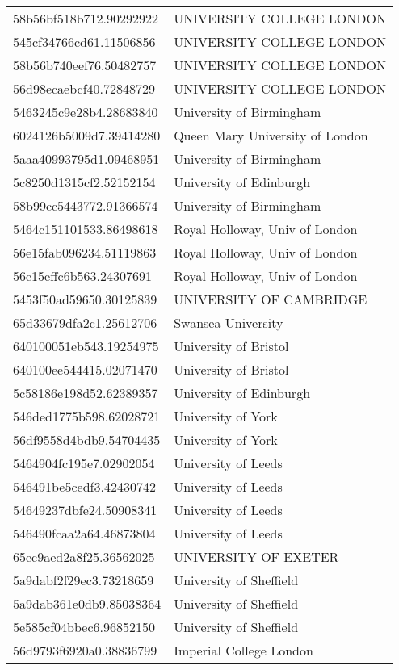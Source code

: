 \begin{tabular}{ll}
58b56bf518b712.90292922 & UNIVERSITY COLLEGE LONDON \\
545cf34766cd61.11506856 & UNIVERSITY COLLEGE LONDON \\
58b56b740eef76.50482757 & UNIVERSITY COLLEGE LONDON \\
56d98ecaebcf40.72848729 & UNIVERSITY COLLEGE LONDON \\
5463245c9e28b4.28683840 & University of Birmingham \\
6024126b5009d7.39414280 & Queen Mary University of London \\
5aaa40993795d1.09468951 & University of Birmingham \\
5c8250d1315cf2.52152154 & University of Edinburgh \\
58b99cc5443772.91366574 & University of Birmingham \\
5464c151101533.86498618 & Royal Holloway, Univ of London \\
56e15fab096234.51119863 & Royal Holloway, Univ of London \\
56e15effc6b563.24307691 & Royal Holloway, Univ of London \\
5453f50ad59650.30125839 & UNIVERSITY OF CAMBRIDGE \\
65d33679dfa2c1.25612706 & Swansea University \\
640100051eb543.19254975 & University of Bristol \\
640100ee544415.02071470 & University of Bristol \\
5c58186e198d52.62389357 & University of Edinburgh \\
546ded1775b598.62028721 & University of York \\
56df9558d4bdb9.54704435 & University of York \\
5464904fc195e7.02902054 & University of Leeds \\
546491be5cedf3.42430742 & University of Leeds \\
54649237dbfe24.50908341 & University of Leeds \\
546490fcaa2a64.46873804 & University of Leeds \\
65ec9aed2a8f25.36562025 & UNIVERSITY OF EXETER \\
5a9dabf2f29ec3.73218659 & University of Sheffield \\
5a9dab361e0db9.85038364 & University of Sheffield \\
5e585cf04bbec6.96852150 & University of Sheffield \\
56d9793f6920a0.38836799 & Imperial College London \\

\end{tabular}
